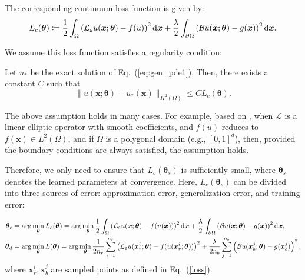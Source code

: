 The corresponding continuum loss function is given by:
\begin{align}
   L_c(\boldsymbol{\theta}) \coloneqq  \frac{1}{2} \int_\Omega \left( \mathcal{L}_\varepsilon u(\boldsymbol{x}; \boldsymbol{\theta}) - f(u) \right)^2 \mathrm{d} \boldsymbol{x}
   + \frac{\lambda}{2} \int_{\partial\Omega} \left( \mathcal{B} u(\boldsymbol{x}; \boldsymbol{\theta}) - g(\boldsymbol{x}) \right)^2 \mathrm{d} \boldsymbol{x}. 
   \label{loss1}
\end{align}

We assume this loss function satisfies a regularity condition:
\begin{assumption}
   Let \( u_* \) be the exact solution of Eq.~(\ref{eq:gen_pde1}). Then, there exists a constant \( C \) such that
   \begin{equation}
       \| u(\boldsymbol{x}; \boldsymbol{\theta}) - u_*(\boldsymbol{x}) \|_{H^2(\Omega)} \leq C L_c(\boldsymbol{\theta}).
   \end{equation}
\end{assumption}

The above assumption holds in many cases. For example, based on \cite{grisvard2011elliptic}, when \( \mathcal{L} \) is a linear elliptic operator with smooth coefficients, and \( f(u) \) reduces to \( f(\boldsymbol{x}) \in L^2(\Omega) \), and if \( \Omega \) is a polygonal domain (e.g., \( [0,1]^d \)), then, provided the boundary conditions are always satisfied, the assumption holds.

Therefore, we only need to ensure that \( L_c(\boldsymbol{\theta}_s) \) is sufficiently small, where \( \boldsymbol{\theta}_s \) denotes the learned parameters at convergence. Here, \( L_c(\boldsymbol{\theta}_s) \) can be divided into three sources of error: approximation error, generalization error, and training error:

\begin{align}
    \boldsymbol{\theta}_c &= \arg \min_{\boldsymbol{\theta}} L_c(\boldsymbol{\theta}) 
    = \arg \min_{\boldsymbol{\theta}} \frac{1}{2} \int_\Omega \left( \mathcal{L}_\varepsilon u(\boldsymbol{x}; \boldsymbol{\theta}) - f(u(\boldsymbol{x})) \right)^2 \mathrm{d} \boldsymbol{x}
   + \frac{\lambda}{2} \int_{\partial\Omega} \left( \mathcal{B} u(\boldsymbol{x}; \boldsymbol{\theta}) - g(\boldsymbol{x}) \right)^2 \mathrm{d} \boldsymbol{x}, \notag\\
    \boldsymbol{\theta}_d &= \arg \min_{\boldsymbol{\theta}} L(\boldsymbol{\theta}) 
    = \arg \min_{\boldsymbol{\theta}} \frac{1}{2n_r} \sum_{i=1}^{n_r} \left( \mathcal{L}_\varepsilon u(\boldsymbol{x}_r^i; \boldsymbol{\theta}) - f(u(\boldsymbol{x}_r^i; \boldsymbol{\theta})) \right)^2
    + \frac{\lambda}{2n_b} \sum_{j=1}^{n_b} \left( \mathcal{B} u(\boldsymbol{x}_b^j; \boldsymbol{\theta}) - g(\boldsymbol{x}_b^j) \right)^2,
\end{align}
where \( \boldsymbol{x}_r^i, \boldsymbol{x}_b^j \) are sampled points as defined in Eq.~(\ref{loss}).

